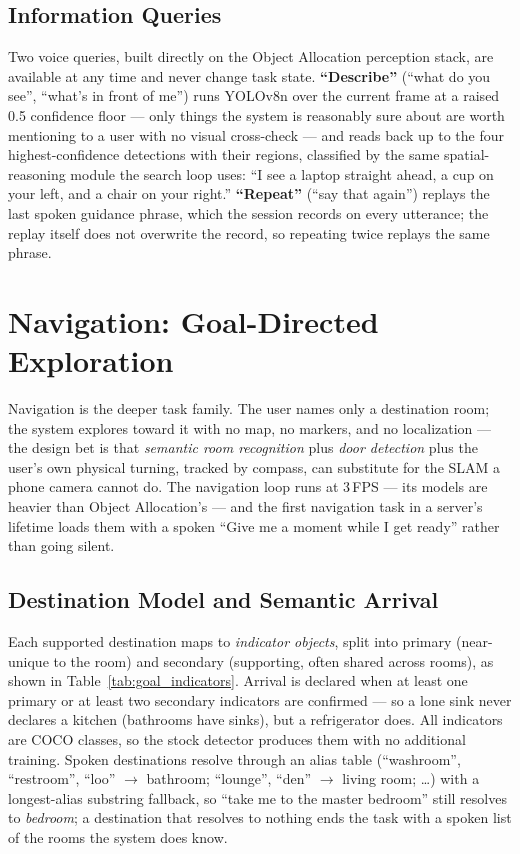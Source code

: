 \subsection{Information Queries}
\label{sec:info_queries}

Two voice queries, built directly on the Object Allocation perception stack, are
available at any time and never change task state. \textbf{``Describe''} (``what
do you see'', ``what's in front of me'') runs YOLOv8n over the current frame at a
raised 0.5 confidence floor --- only things the system is reasonably sure about are
worth mentioning to a user with no visual cross-check --- and reads back up to the
four highest-confidence detections with their regions, classified by the same
spatial-reasoning module the search loop uses: ``I see a laptop straight ahead, a
cup on your left, and a chair on your right.'' \textbf{``Repeat''} (``say that
again'') replays the last spoken guidance phrase, which the session records on
every utterance; the replay itself does not overwrite the record, so repeating
twice replays the same phrase.

\section{Navigation: Goal-Directed Exploration}
\label{sec:navigation}

Navigation is the deeper task family. The user names only a destination room; the
system explores toward it with no map, no markers, and no localization --- the
design bet is that \emph{semantic room recognition} plus \emph{door detection} plus
the user's own physical turning, tracked by compass, can substitute for the SLAM a
phone camera cannot do. The navigation loop runs at 3\,FPS --- its models are
heavier than Object Allocation's --- and the first navigation task in a server's
lifetime loads them with a spoken ``Give me a moment while I get ready'' rather
than going silent.

\subsection{Destination Model and Semantic Arrival}
\label{sec:goals_model}

Each supported destination maps to \emph{indicator objects}, split into primary
(near-unique to the room) and secondary (supporting, often shared across rooms), as
shown in Table~\ref{tab:goal_indicators}. Arrival is declared when at least one
primary or at least two secondary indicators are confirmed --- so a lone sink never
declares a kitchen (bathrooms have sinks), but a refrigerator does. All indicators
are COCO classes, so the stock detector produces them with no additional training.
Spoken destinations resolve through an alias table (``washroom'', ``restroom'',
``loo'' $\to$ bathroom; ``lounge'', ``den'' $\to$ living room; \ldots) with a
longest-alias substring fallback, so ``take me to the master bedroom'' still
resolves to \emph{bedroom}; a destination that resolves to nothing ends the task
with a spoken list of the rooms the system does know.

